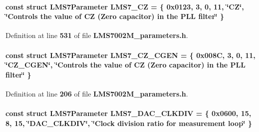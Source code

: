 \paragraph[{L\+M\+S7\+\_\+\+CZ}]{\setlength{\rightskip}{0pt plus 5cm}const struct {\bf L\+M\+S7\+Parameter} L\+M\+S7\+\_\+\+CZ = \{ 0x0123, 3, 0, 11, \char`\"{}\+C\+Z\char`\"{}, \char`\"{}\+Controls the value of C\+Z (\+Zero capacitor) in the P\+L\+L filter\char`\"{} \}\hspace{0.3cm}{\ttfamily [static]}}\label{LMS7002M__parameters_8h_a59589e52c0f9d6f61f077a4cbdf7bba5}


Definition at line {\bf 531} of file {\bf L\+M\+S7002\+M\+\_\+parameters.\+h}.

\paragraph[{L\+M\+S7\+\_\+\+C\+Z\+\_\+\+C\+G\+EN}]{\setlength{\rightskip}{0pt plus 5cm}const struct {\bf L\+M\+S7\+Parameter} L\+M\+S7\+\_\+\+C\+Z\+\_\+\+C\+G\+EN = \{ 0x008\+C, 3, 0, 11, \char`\"{}\+C\+Z\+\_\+\+C\+G\+E\+N\char`\"{}, \char`\"{}\+Controls the value of C\+Z (\+Zero capacitor) in the P\+L\+L filter\char`\"{} \}\hspace{0.3cm}{\ttfamily [static]}}\label{LMS7002M__parameters_8h_aa06264e773fd13e757467899c86e5ec8}


Definition at line {\bf 206} of file {\bf L\+M\+S7002\+M\+\_\+parameters.\+h}.

\paragraph[{L\+M\+S7\+\_\+\+D\+A\+C\+\_\+\+C\+L\+K\+D\+IV}]{\setlength{\rightskip}{0pt plus 5cm}const struct {\bf L\+M\+S7\+Parameter} L\+M\+S7\+\_\+\+D\+A\+C\+\_\+\+C\+L\+K\+D\+IV = \{ 0x0600, 15, 8, 15, \char`\"{}\+D\+A\+C\+\_\+\+C\+L\+K\+D\+I\+V\char`\"{}, \char`\"{}\+Clock division ratio for measurement loop\char`\"{} \}\hspace{0.3cm}{\ttfamily [static]}}\label{LMS7002M__parameters_8h_af28e53ccc1323d34fdf966b648d926cc}


